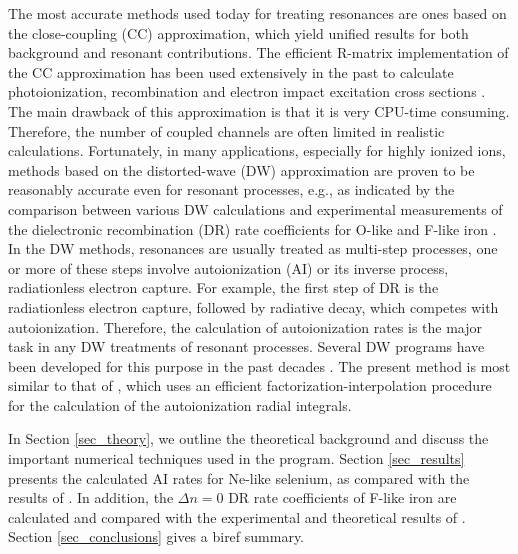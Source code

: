 \documentclass[preprint, floatfix, pra, showpacs, showkeys]{revtex4}
\begin{document}
The most accurate methods used today for treating resonances are ones based on
the close-coupling (CC) approximation, which yield unified results for both
background and resonant contributions. The efficient R-matrix implementation
of the CC approximation has been used extensively in the past to calculate
photoionization, recombination and electron impact excitation cross sections
\cite{hummer93, berrington95}. The main drawback of this approximation is
that it is very CPU-time consuming. Therefore, the number of coupled
channels are often limited in realistic calculations. Fortunately, in many
applications, especially for highly 
ionized ions, methods based on the distorted-wave (DW) approximation are
proven to be reasonably accurate even for resonant processes, e.g., as
indicated by the comparison between various DW calculations and experimental 
measurements of the dielectronic recombination (DR) rate coefficients for
O-like and F-like iron \cite{savin99}. In the DW methods, resonances are
usually treated as 
multi-step processes, one or more of these steps involve autoionization (AI)
or its inverse process, radiationless
electron capture. For example, the first step of DR is the radiationless
electron capture, followed by radiative decay, which competes with
autoionization. Therefore, the calculation of autoionization rates is the
major task in any DW treatments of resonant processes. Several DW programs
have been developed for this purpose in the past decades \cite{pindzola80,
kim87, oreg91}. The present method is most similar to that of
\textcite{oreg91}, which uses an efficient factorization-interpolation procedure
for the calculation of the autoionization radial integrals. 

In Section \ref{sec_theory}, we outline the theoretical background and discuss
the important numerical techniques used in the program. Section
\ref{sec_results} presents the calculated AI rates for Ne-like selenium, as
compared with the results of \textcite{oreg91}. In addition, 
the $\Delta n = 0$ DR rate coefficients of F-like iron are calculated and
compared with the experimental and theoretical results of \textcite{savin99}. 
Section \ref{sec_conclusions} gives a biref summary.
\end{document}
